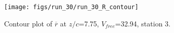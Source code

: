 \begin{figure}[H]
\centering
\texttt{[image: figs/run\_30/run\_30\_R\_contour]}
\caption{Contour plot of $\overline{r}$ at $z/c$=7.75, $V_{free}$=32.94, station 3.}
\label{fig:run_30_R_contour}
\end{figure}


